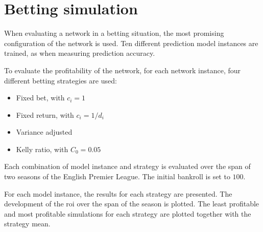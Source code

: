 \section{Betting simulation}

When evaluating a network in a betting situation, the most promising configuration of the network is used. Ten different prediction model instances are trained, as when measuring prediction accuracy.

To evaluate the profitability of the network, for each network instance, four different betting strategies are used:
\begin{itemize}[noitemsep]
    \item Fixed bet, with $c_{i} = 1$
    \item Fixed return, with $c_{i} = 1 / d_{i}$
    \item Variance adjusted
    \item Kelly ratio, with  $C_{0} = 0.05$
\end{itemize}
Each combination of model instance and strategy is evaluated over the span of two seasons of the English Premier League. The initial bankroll is set to $100$.

For each model instance, the results for each strategy are presented. The development of the \gls{roi} over the span of the season is plotted. The least profitable and most profitable simulations for each strategy are plotted together with the strategy mean.